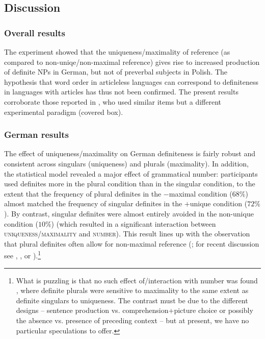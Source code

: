 \documentclass[output=paper]{langscibook}
\begin{document}
\subsection{Discussion}

\subsubsection{Overall results}

The experiment showed that the uniqueness/maximality of reference (as compared to non-uniqe/non-maximal reference) gives rise to increased production of definite NPs in German, but not of preverbal subjects in Polish. The hypothesis that word order in articleless languages can correspond to definiteness in languages with articles has thus not been confirmed. The present results corroborate those reported in \citet{Simik.Demian2020}, who used similar items but a different experimental paradigm (covered box).


\subsubsection{German results}

The effect of uniqueness/maximality on German definiteness is fairly robust and consistent across singulars (uniqueness) and plurals (maximality). In addition, the statistical model revealed a major effect of grammatical number: participants used definites more in the plural condition than in the singular condition, to the extent that the frequency of plural definites in the \textsf{$-$maximal} condition ($68\%$) almost matched the frequency of singular definites in the \textsf{$+$unique} condition ($72\%$). By contrast, singular definites were almost entirely avoided in the non-unique condition ($10\%$) (which resulted in a significant interaction between \textsc{uniqueness/maximality} and \textsc{number}). This result lines up with the observation that plural definites often allow for non-maximal reference (\citealt{Fodor1970}; for recent discussion see \citealt{Brisson1998}, \citealt{Lasersohn1999}, or \citealt{Kriz2016}).\footnote{What is puzzling is that no such effect of/interaction with number was found \citet{Simik.Demian2020}, where definite plurals were sensitive to maximality to the same extent as definite singulars to uniqueness. The contrast must be due to the different designs -- sentence production vs. comprehension+picture choice or possibly the absence vs. presence of preceding context -- but at present, we have no particular speculations to offer.}
\end{document}
